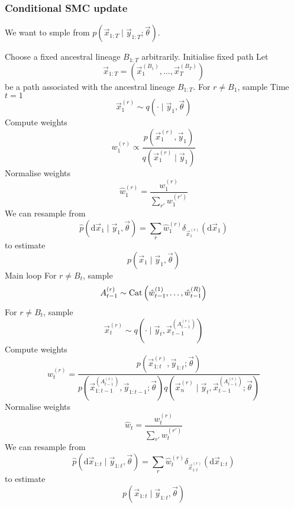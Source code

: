 \subsubsection{Conditional SMC update}
We want to smple from $p(\vec x_{1:T} \mid \vec y_{1:T}; \vec \theta)$.
    \begin{algorithmbis}\label{alg:csmc}
        \begin{algorithmic}[1]
            \State Choose a fixed ancestral lineage $B_{1:T}$ arbitrarily. \Comment Initialise fixed path
            \State Let
                $$\vec x_{1:T} = \left(\vec x_1^{(B_1)}, \dotsc, \vec x_T^{(B_T)}\right)$$
                be a path associated with the ancestral lineage $B_{1:T}$.
            \State For $r \neq B_1$, sample \Comment Time $t = 1$
                $$\vec x_1^{(r)} \sim q(\cdot \mid \vec y_1, \vec \theta)$$
            \State Compute weights
                $$w_1^{(r)} \propto \frac{p\left(\vec x_1^{(r)}, \vec y_1\right)}{q\left(\vec x_1^{(r)} \mid \vec y_1\right)}$$
            \State Normalise weights
                $$\hat w_1^{(r)} = \frac{w_1^{(r)}}{\sum_{r'} w_1^{(r')}}$$
            \State We can resample from 
                $$\hat p(\mathrm d \vec x_1 \mid \vec y_1, \vec \theta) = \sum_r \hat w_1^{(r)} \delta_{\vec x_1^{(r)}}(\mathrm d\vec x_1)$$
                to estimate
                $$p(\vec x_1 \mid \vec y_1, \vec \theta)$$
             \Comment Main loop
                \State For $r \neq B_t$, sample
                    $$A_{t - 1}^{(r)} \sim \operatorname{Cat}\left(\hat w_{t - 1}^{(1)}, \dotsc, \hat w_{t - 1}^{(R)}\right)$$
                \State For $r \neq B_t$, sample
                    $$\vec x_t^{(r)} \sim q\left(\cdot \mid \vec y_t, \vec x_{t - 1}^{(A_{t - 1}^{(r)})}\right)$$
                \State Compute weights
                    $$w_t^{(r)} = \frac{p\left(\vec x_{1:t}^{(r)}, \vec y_{1:t}; \vec \theta\right)}{p\left(\vec x_{1:t - 1}^{\left(A_{t - 1}^{(r)}\right)}, \vec y_{1:t-1}; \vec \theta\right) q\left(\vec x_n^{(r)} \mid \vec y_t, \vec x_{t - 1}^{\left(A_{t - 1}^{(r)}\right)}; \vec \theta\right)}$$
                \State Normalise weights
                    $$\hat w_t = \frac{w_t^{(r)}}{\sum_{r'} w_t^{(r')}}$$
                \State We can resample from
                    $$\hat p(\mathrm d \vec x_{1:t} \mid \vec y_{1:t}, \vec \theta) = \sum_r \hat w_t^{(r)} \delta_{\vec x_{1:t}^{(r)}}(\mathrm d \vec x_{1:t})$$
                    to estimate
                    $$p(\vec x_{1:t} \mid \vec y_{1:t}, \vec \theta)$$
            \EndFor
        \end{algorithmic}
    \end{algorithmbis}